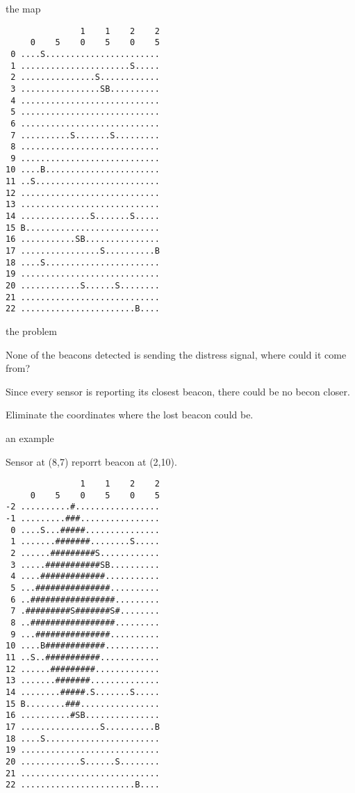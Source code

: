 \begin{frame}[fragile]{the map}

  \tiny{
  \begin{verbatim}
               1    1    2    2
     0    5    0    5    0    5
 0 ....S.......................
 1 ......................S.....
 2 ...............S............
 3 ................SB..........
 4 ............................
 5 ............................
 6 ............................
 7 ..........S.......S.........
 8 ............................
 9 ............................
10 ....B.......................
11 ..S.........................
12 ............................
13 ............................
14 ..............S.......S.....
15 B...........................
16 ...........SB...............
17 ................S..........B
18 ....S.......................
19 ............................
20 ............S......S........
21 ............................
22 .......................B....
\end{verbatim}
}
\end{frame}


\begin{frame}{the problem}


  \vspace{20pt} \pause None of the beacons detected is sending the
  distress signal, where could it come from?

  \vspace{20pt} \pause Since every sensor is reporting its closest
  beacon, there could be no becon closer.
  
  \vspace{20pt} \pause Eliminate the coordinates where the lost beacon
  could be.

\end{frame}


\begin{frame}[fragile]{an example}

  Sensor at (8,7) reporrt beacon at (2,10).
  \vspace{10pt}\pause

  \tiny{
  \begin{verbatim}
               1    1    2    2
     0    5    0    5    0    5
-2 ..........#.................
-1 .........###................
 0 ....S...#####...............
 1 .......#######........S.....
 2 ......#########S............
 3 .....###########SB..........
 4 ....#############...........
 5 ...###############..........
 6 ..#################.........
 7 .#########S#######S#........
 8 ..#################.........
 9 ...###############..........
10 ....B############...........
11 ..S..###########............
12 ......#########.............
13 .......#######..............
14 ........#####.S.......S.....
15 B........###................
16 ..........#SB...............
17 ................S..........B
18 ....S.......................
19 ............................
20 ............S......S........
21 ............................
22 .......................B....
\end{verbatim}  
    }
\end{frame}


